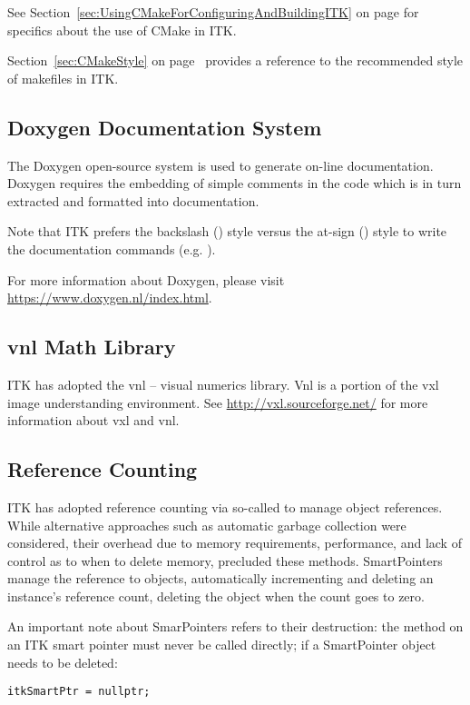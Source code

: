 See Section~\ref{sec:UsingCMakeForConfiguringAndBuildingITK} on page
\pageref{sec:UsingCMakeForConfiguringAndBuildingITK} for specifics about the use
of CMake in ITK.

Section~\ref{sec:CMakeStyle} on page~\pageref{sec:CMakeStyle} provides a
reference to the recommended style of makefiles in ITK.

\subsection{Doxygen Documentation System}
\label{subsec:DoxygenDocumentationSystem}

The Doxygen open-source system is used to generate on-line documentation.
Doxygen requires the embedding of simple comments in the code which is in turn
extracted and formatted into documentation.

Note that ITK prefers the backslash (\code{\textbackslash}) style versus the
at-sign () style to write the documentation commands (e.g.
).

For more information about Doxygen, please visit
\href{https://www.doxygen.nl/index.html}{https://www.doxygen.nl/index.html}.

\subsection{vnl Math Library}
\label{subsec:vnlMathLibrary}

ITK has adopted the vnl -- visual numerics library. Vnl is a portion of the vxl image
understanding environment. See \href{http://vxl.sourceforge.net/}{http://vxl.sourceforge.net/}
for more information about vxl and vnl.


\subsection{Reference Counting}
\label{subsec:ReferenceCounting}

ITK has adopted reference counting via so-called  to
manage object references. While alternative approaches such as automatic garbage
collection were considered, their overhead due to memory requirements,
performance, and lack of control as to when to delete memory, precluded these
methods. SmartPointers manage the reference to objects, automatically
incrementing and deleting an instance's reference count, deleting the object
when the count goes to zero.

An important note about SmarPointers refers to their destruction: the
 method on an ITK smart pointer must never be called directly; if
a SmartPointer object  needs to be deleted:
\small
\begin{verbatim}
itkSmartPtr = nullptr;
\end{verbatim}
\normalsize

